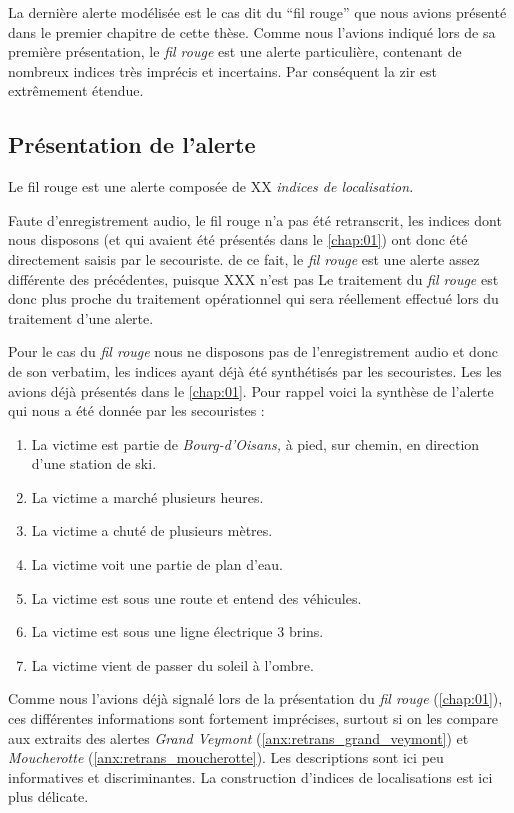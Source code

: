 
La dernière alerte modélisée est le cas dit du \enquote{fil rouge} que
nous avions présenté dans le premier chapitre de cette thèse. Comme
nous l'avions indiqué lors de sa première présentation, le \emph{fil
  rouge} est une alerte particulière, contenant de nombreux indices
très imprécis et incertains. Par conséquent la \ac{zir} est
extrêmement étendue.


\subsection{Présentation de l'alerte}
\label{subsec:9-4-1}

Le fil rouge est une alerte composée de XX \emph{indices de
  localisation.}


Faute d'enregistrement audio, le fil rouge n'a pas été retranscrit,
les indices dont nous disposons (et qui avaient été présentés dans le
\autoref{chap:01}) ont donc été directement saisis par le secouriste.
%
de ce fait, le \emph{fil rouge} est une alerte assez différente des
précédentes, puisque XXX n'est pas
%
Le traitement du \emph{fil rouge} est donc plus proche du traitement
opérationnel qui sera réellement effectué lors du traitement d'une
alerte.


Pour le cas du \emph{fil rouge} nous ne disposons pas de
l'enregistrement audio et donc de son verbatim, les indices ayant déjà 
été synthétisés par les secouristes. Les les avions déjà présentés
dans le \autoref{chap:01}.
%
Pour rappel voici la synthèse de l'alerte qui nous a été donnée par
les secouristes :
%
\begin{enumerate}
\item La victime est partie de \emph{Bourg-d'Oisans,} à pied, sur
  chemin, en direction d'une station de ski.
\item La victime a marché plusieurs heures.
\item La victime a chuté de plusieurs mètres.
\item La victime voit une partie de plan d'eau.
\item La victime est sous une route et entend des véhicules.
\item La victime est sous une ligne électrique 3 brins.
\item La victime vient de passer du soleil à l'ombre.
\end{enumerate}

Comme nous l'avions déjà signalé lors de la présentation du \emph{fil
  rouge} (\autoref{chap:01}), ces différentes informations sont
fortement imprécises, surtout si on les compare aux extraits des
alertes \emph{Grand Veymont} (\autoref{anx:retrans_grand_veymont}) et
\emph{Moucherotte} (\autoref{anx:retrans_moucherotte}). Les
descriptions sont ici peu informatives et discriminantes. La
construction d'indices de localisations est ici plus délicate.


